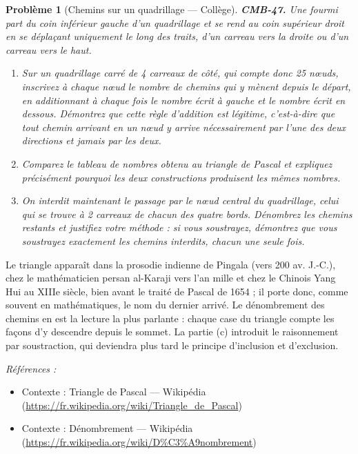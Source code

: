 \documentclass[11pt]{article}
\newtheorem{problem}{Problème}
\newenvironment{refs}{\par\small\noindent\emph{Références :}\begin{itemize}\setlength\itemsep{0pt}}{\end{itemize}\normalsize}
\begin{document}
\begin{problem}[{Chemins sur un quadrillage --- Collège}]
\textbf{CMB-47.} Une fourmi part du coin inférieur gauche d'un quadrillage et se rend au coin
supérieur droit en se déplaçant uniquement le long des traits, d'un carreau vers la droite ou d'un
carreau vers le haut.
\begin{enumerate}
\item[(a)] Sur un quadrillage carré de 4 carreaux de côté, qui compte donc 25 n\oe{}uds, inscrivez à chaque
n\oe{}ud le nombre de chemins qui y mènent depuis le départ, en additionnant à chaque fois le nombre
écrit à gauche et le nombre écrit en dessous. Démontrez que cette règle d'addition est légitime,
c'est-à-dire que tout chemin arrivant en un n\oe{}ud y arrive nécessairement par l'une des deux
directions et jamais par les deux.
\item[(b)] Comparez le tableau de nombres obtenu au triangle de Pascal et expliquez précisément pourquoi
les deux constructions produisent les mêmes nombres.
\item[(c)] On interdit maintenant le passage par le n\oe{}ud central du quadrillage, celui qui se trouve à
2 carreaux de chacun des quatre bords. Dénombrez les chemins restants et justifiez votre méthode :
si vous soustrayez, démontrez que vous soustrayez exactement les chemins interdits, chacun une
seule fois.
\end{enumerate}

\end{problem}

\noindent Le triangle apparaît dans la prosodie indienne de Pingala (vers 200 av. J.-C.),
chez le mathématicien persan al-Karaji vers l'an mille et chez le Chinois Yang Hui au
XIIIe siècle, bien avant le traité de Pascal de 1654 ; il porte donc, comme souvent en
mathématiques, le nom du dernier arrivé. Le dénombrement des chemins en est la lecture la plus
parlante : chaque case du triangle compte les façons d'y descendre depuis le sommet. La partie (c)
introduit le raisonnement par soustraction, qui deviendra plus tard le principe d'inclusion et
d'exclusion.

\begin{refs}
\item Contexte : Triangle de Pascal --- Wikipédia (\url{https://fr.wikipedia.org/wiki/Triangle_de_Pascal})
\item Contexte : Dénombrement --- Wikipédia (\url{https://fr.wikipedia.org/wiki/D%C3%A9nombrement})
\end{refs}
\end{document}

